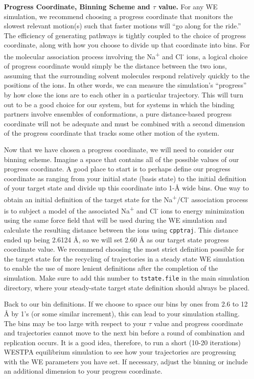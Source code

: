 \documentclass[9pt,tutorial,ASAPversion]{livecoms}
\begin{document}
\textbf{Progress Coordinate, Binning Scheme and $\tau$ value.}  For any WE simulation, we recommend choosing a progress coordinate that monitors the slowest relevant motion(s) such that faster motions will “go along for the ride.” 
The efficiency of generating pathways is tightly coupled to the choice of progress coordinate, along with how you choose to divide up that coordinate into bins. 
For the molecular association process involving the Na\textsuperscript{+} and Cl\textsuperscript{-} ions, a logical choice of progress coordinate would simply be the distance between the two ions, assuming that the surrounding solvent molecules respond relatively quickly to the positions of the ions. 
In other words, we can measure the simulation’s “progress” by how close the ions are to each other in a particular trajectory. 
This will turn out to be a good choice for our system, but for systems in which the binding partners involve ensembles of conformations, a pure distance-based progress coordinate will not be adequate and must be combined with a second dimension of the progress coordinate that tracks some other motion of the system.

Now that we have chosen a progress coordinate, we will need to consider our binning scheme. 
Imagine a space that contains all of the possible values of our progress coordinate. 
A good place to start is to perhaps define our progress coordinate as ranging from your initial state (basis state) to the initial definition of your target state and divide up this coordinate into 1-\AA{} wide bins. 
One way to obtain an initial definition of the target state for the Na\textsuperscript{+}/Cl\textsuperscript{-} association process is to subject a model of the associated Na\textsuperscript{+} and Cl\textsuperscript{-} ions to energy minimization using the same force field that will be used during the WE simulation and calculate the resulting distance between the ions using \verb|cpptraj|. 
This distance ended up being 2.6124 \AA{}, so we will set 2.60 \AA{} as our target state progress coordinate value. 
We recommend choosing the most strict definition possible for the target state for the recycling of trajectories in a steady state WE simulation to enable the use of more lenient definitions after the completion of the simulation. 
Make sure to add this number to \verb|tstate.file| in the main simulation directory, where your steady-state target state definition should always be placed.

Back to our bin definitions. 
If we choose to space our bins by ones from 2.6 to 12 \AA{} by 1’s (or some similar increment), this can lead to your simulation stalling. 
The bins may be too large with respect to your $\tau$ value and progress coordinate and trajectories cannot move to the next bin before a round of combination and replication occurs. 
It is a good idea, therefore, to run a short (10-20 iterations) WESTPA equilibrium simulation to see how your trajectories are progressing with the WE parameters you have set.
If necessary, adjust the binning or include an additional dimension to your progress coordinate.
\end{document}
